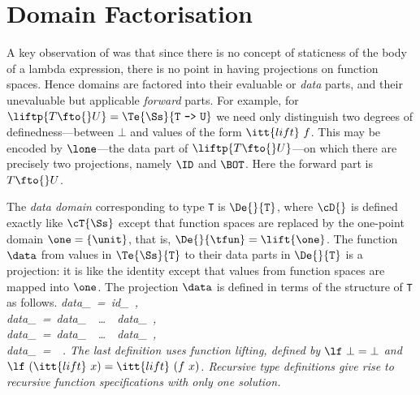\section{Domain Factorisation}

A key observation of \cite{Dav93b} was that since there is no concept
of staticness of the body of a lambda expression, there is no point in
having projections on function spaces.  Hence domains are factored into
their evaluable or {\it data\/} parts, and their unevaluable but
applicable {\it forward\/} parts.  For example, for
$\liftp{T\fto{}U}=\Te{\Ss}{\mbox{\tt T}\ \mbox{\tt ->}\ \mbox{\tt U}}$ we need only distinguish two
degrees of definedness---between $\bot$ and values of the form
$\itt{lift}~f$.  This may be encoded by $\lone$---the data part of
$\liftp{T\fto{}U}$---on which there are precisely two projections,
namely $\ID$ and $\BOT$.  Here the forward part is $T\fto{}U$.

The {\it data domain\/} corresponding to type \mbox{\tt T} is $\De{}{\mbox{\tt T}}$,
where $\cD{}$ is defined exactly like $\cT{\Ss}$ except that function
spaces are replaced by the one-point domain $\one=\{\unit\}$, that is,
$\De{}{\tfun}=\lift{\one}$.  The function $\data$ from values in
$\Te{\Ss}{\mbox{\tt T}}$ to their data parts in $\De{}{\mbox{\tt T}}$ is a projection:
it is like the identity except that values from function spaces are
mapped into $\one$.  The projection $\data$ is defined in terms of the
structure of \mbox{\tt T} as follows.
\beqs
\it {\it{}data}_{\subtypespace\stint}\ =\ {\it{}id}_{\subtypespace\stint}\ ,\espace\\
\it {\it{}data}_{\subtypespace\stprod}\ =\ {\it{}data}_{\subtypespace\stone}\ \times\ \ldots\ \times\ {\it{}data}_{\subtypespace\stn}\ ,\espace\\
\it {\it{}data}_{\subtypespace\stsum}\ =\ {\it{}data}_{\subtypespace\stone}\ \plus\ \ldots\ \plus\ {\it{}data}_{\subtypespace\stn}\ ,\espace\\
\it {\it{}data}_{\subtypespace\stfun}\ =\ {}\ .
\eeqs
The last definition uses function lifting, defined by $\lf~\bot=\bot$
and $\lf~(\itt{lift}~x)=\itt{lift}~(f~x)$.  Recursive type definitions
give rise to recursive function specifications with only one solution.

